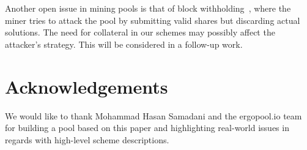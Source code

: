 \documentclass{llncs}
\begin{document}
Another open issue in mining pools is that of block withholding~\cite{courtois2014subversive}, where the miner tries to attack the pool by submitting valid shares but discarding actual solutions. The need for collateral in our schemes may possibly affect the attacker's strategy. This will be considered in a follow-up work.

\section*{Acknowledgements}
\label{*acknowledgements}

We would like to thank Mohammad Hasan Samadani and the ergopool.io team for building a pool based on this paper and highlighting real-world issues in regards with high-level scheme descriptions.



\appendix
\end{document}
